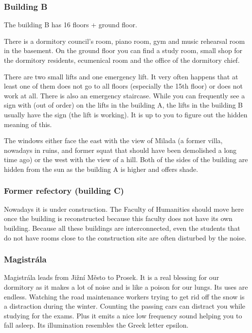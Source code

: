 \subsubsection{Building B}
The building B has 16 floors + ground floor.

There is a dormitory council's room, piano room, gym and music rehearsal room in
the basement. On the ground floor you can find a study room, small shop for the
dormitory residents, ecumenical room and the office of the dormitory chief.

There are two small lifts and one emergency lift. It very often happens that at
least one of them does not go to all floors (especially the 15th floor) or does
not work at all. There is also an emergency staircase.
While you can frequently see a sign with  (out of order) on the
lifts in the building A, the lifts in the building B usually have the sign
 (the lift is working). It is up to you to figure out the
hidden meaning of this.

The windows either face the east with the view of Milada (a former villa,
nowadays in ruins, and former squat that should have been demolished a long time
ago) or the west with the view of a hill.
Both of the sides of the building are hidden from the sun as the building A is
higher and offers shade.

\subsubsection{Former refectory (building C)}
Nowadays it is under construction. The Faculty of Humanities should move here
once the building is reconstructed because this faculty does not have its own
building.
Because all these buildings are interconnected, even the students that do not
have rooms close to the construction site are often disturbed by the noise.


\subsubsection{Magistrála}
Magistrála leads from Jižní Město to Prosek. It is a real blessing for our
dormitory as it makes a lot of noise and is like a poison for our lungs. Its
uses are endless.
Watching the road maintenance workers trying to get rid off the snow is a
distraction during the winter. Counting the passing cars can distract you while
studying for the exams. Plus it emits a nice low frequency sound helping you to
fall asleep.
Its illumination resembles the Greek letter epsilon.

